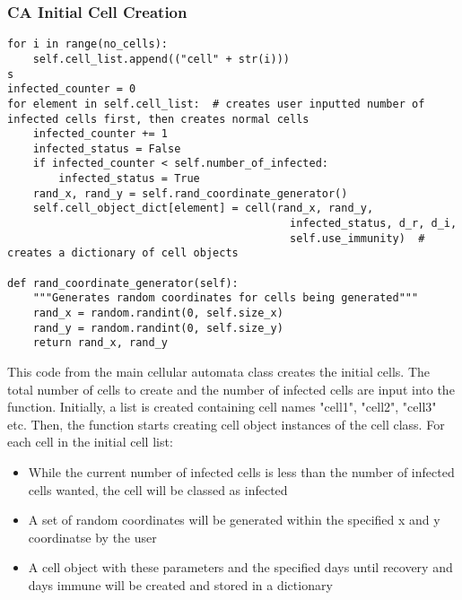 \documentclass[11pt, a4paper]{article}
\begin{document}
\subsubsection{CA Initial Cell Creation}
\begin{lstlisting}
for i in range(no_cells):
    self.cell_list.append(("cell" + str(i)))
s
infected_counter = 0
for element in self.cell_list:  # creates user inputted number of infected cells first, then creates normal cells
    infected_counter += 1
    infected_status = False
    if infected_counter < self.number_of_infected:
        infected_status = True
    rand_x, rand_y = self.rand_coordinate_generator()
    self.cell_object_dict[element] = cell(rand_x, rand_y,
                                            infected_status, d_r, d_i,
                                            self.use_immunity)  # creates a dictionary of cell objects

def rand_coordinate_generator(self):
    """Generates random coordinates for cells being generated"""
    rand_x = random.randint(0, self.size_x)
    rand_y = random.randint(0, self.size_y)
    return rand_x, rand_y
\end{lstlisting}
This code from the main cellular automata class creates the initial cells. The total number of cells to create and the number of infected cells are input into the function. Initially, a list is created containing cell names "cell1", "cell2", "cell3" etc. Then, the function starts creating cell object instances of the cell class. For each cell in the initial cell list:
\begin{itemize}
    \item While the current number of infected cells is less than the number of infected cells wanted, the cell will be classed as infected
    \item A set of random coordinates will be generated within the specified x and y coordinatse by the user
    \item A cell object with these parameters and the specified days until recovery and days immune will be created and stored in a dictionary
\end{itemize}
\end{document}
